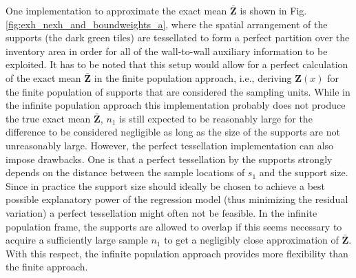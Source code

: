 One implementation to approximate the exact mean $\bar{\pmb{Z}}$ is shown in Fig. \ref{fig:exh_nexh_and_boundweights_a}, where the spatial arrangement of the supports (the dark green tiles) are tessellated to form a perfect partition over the inventory area in order for all of the wall-to-wall auxiliary information to be exploited. It has to be noted that this setup would allow for a perfect calculation of the exact mean $\bar{\pmb{Z}}$ in the finite population approach, i.e., deriving $\pmb{Z}(x)$ for the finite population of supports that are considered the sampling units. While in the infinite population approach this implementation probably does not produce the true exact mean $\bar{\pmb{Z}}$, $n_1$ is still expected to be reasonably large for the difference to be considered negligible as long as the size of the supports are not unreasonably large. However, the perfect tessellation implementation can also impose drawbacks. One is that a perfect tessellation by the supports strongly depends on the distance between the sample locations of $s_1$ and the support size. Since in practice the support size should ideally be chosen to achieve a best possible explanatory power of the regression model (thus minimizing the residual variation) a perfect tessellation might often not be feasible. In the infinite population frame, the supports are allowed to overlap if this seems necessary to acquire a sufficiently large sample $n_1$ to get a negligibly close approximation of $\bar{\pmb{Z}}$. With this respect, the infinite population approach provides more flexibility than the finite approach.

